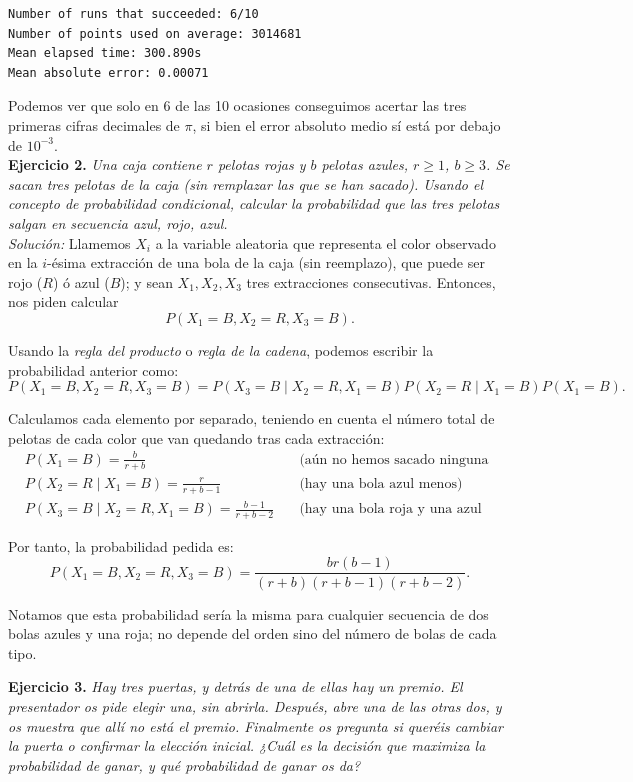 \documentclass[11pt,a4paper]{article}
\begin{document}
\begin{verbatim}
Number of runs that succeeded: 6/10
Number of points used on average: 3014681
Mean elapsed time: 300.890s
Mean absolute error: 0.00071
\end{verbatim}

Podemos ver que solo en 6 de las 10 ocasiones conseguimos acertar las tres primeras cifras decimales de $\pi$, si bien el error absoluto medio sí está por debajo de $10^{-3}$.\\

\textbf{Ejercicio 2.} \textit{Una caja contiene $r$ pelotas rojas y $b$ pelotas azules, $r \geq 1$, $b \geq 3$. Se sacan tres pelotas de la caja (sin remplazar las que se han sacado). Usando el concepto de probabilidad condicional, calcular la probabilidad que las tres pelotas salgan en secuencia azul, rojo, azul.}\\

\textit{Solución:} Llamemos $X_i$ a la variable aleatoria que representa el color observado en la $i$-ésima extracción de una bola de la caja (sin reemplazo), que puede ser rojo ($R$) ó azul ($B$); y sean $X_1, X_2, X_3$ tres extracciones consecutivas. Entonces, nos piden calcular
\[
P(X_1 = B, X_2 = R, X_3 = B).
\]

Usando la \textit{regla del producto} o \textit{regla de la cadena}, podemos escribir la probabilidad anterior como:
\[
P(X_1 =B, X_2 = R, X_3 = B) = P(X_3 = B \mid X_2 = R, X_1 = B)P(X_2 = R \mid X_1 = B)P(X_1 = B).
\]

Calculamos cada elemento por separado, teniendo en cuenta el número total de pelotas de cada color que van quedando tras cada extracción:
\begin{align*}
  &P(X_1 = B)= \frac{b}{r+b}\quad &\text{(aún no hemos sacado ninguna bola)}\\
  &P(X_2 = R \mid X_1 = B) = \frac{r}{r + b - 1}\quad &\text{(hay una bola azul menos)}\\
  &P(X_3 = B \mid X_2 = R, X_1 = B) = \frac{b - 1}{r + b - 2}\quad &\text{(hay una bola roja y una azul menos)}
\end{align*}

Por tanto, la probabilidad pedida es:
\[
P(X_1 = B, X_2 = R, X_3 = B) = \frac{br(b-1)}{(r+b)(r+b-1)(r+b-2)}.
\]

Notamos que esta probabilidad sería la misma para cualquier secuencia de dos bolas azules y una roja; no depende del orden sino del número de bolas de cada tipo.

\textbf{Ejercicio 3.} \textit{Hay tres puertas, y detrás de una de ellas hay un premio. El presentador os pide elegir una, sin abrirla. Después, abre una de las otras dos, y os muestra que allí no está el premio. Finalmente os pregunta si queréis cambiar la puerta o confirmar la elección inicial. ¿Cuál es la decisión que maximiza la probabilidad de ganar, y qué probabilidad de ganar os da?}\\
\end{document}
